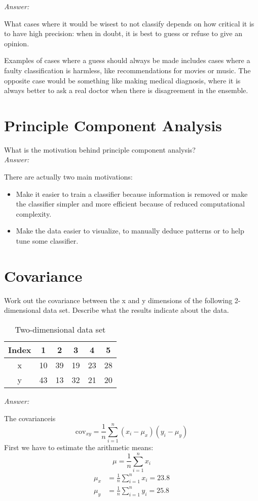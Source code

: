 \textit{Answer:}

What cases where it would be wisest to not classify depends on how critical it is to have high precision: when in doubt, it is best to guess or refuse to give an opinion.

Examples of cases where a guess should always be made includes cases where a faulty classification is harmless, like recommendations for movies or music.
The opposite case would be something like making medical diagnosis, where it is always better to ask a real doctor when there is disagreement in the ensemble.

\section{Principle Component Analysis}
What is the motivation behind principle component analysis?\\

\textit{Answer:}

There are actually two main motivations:
\begin{itemize}
    \item Make it easier to train a classifier because information is removed or make the classifier simpler and more efficient because of reduced computational complexity.
    \item Make the data easier to visualize, to manually deduce patterns or to help tune some classifier.
\end{itemize}

\section{Covariance}
Work out the covariance between the x and y dimensions of the following 2-dimensional data set.
Describe what the results indicate about the data.

\begin{table}[H]
\centering
  \begin{tabular}{c|c|c|c|c|c}
    Index &  1 &  2 &  3 &  4 &  5 \\ \hline
    x     & 10 & 39 & 19 & 23 & 28 \\
    y     & 43 & 13 & 32 & 21 & 20 \\ \hline
  \end{tabular}
  \caption{Two-dimensional data set}
  \label{tab:cov}
\end{table}

\textit{Answer:}

The covariance\footnotemark is
\begin{equation}
    \text{cov}_{xy} = \frac{1}{n}\sum\limits_{i=1}^{n}(x_i-\mu_x)(y_i-\mu_y)
\end{equation}
First we have to estimate the arithmetic means:
\begin{equation}
    \mu = \frac{1}{n}\sum\limits_{i=1}^{n}x_i
\end{equation}
\begin{align*}
    \mu_x &= \frac{1}{n}\sum\limits_{i=1}^{n}x_i = 23.8\\
    \mu_y &= \frac{1}{n}\sum\limits_{i=1}^{n}y_i = 25.8
\end{align*}

